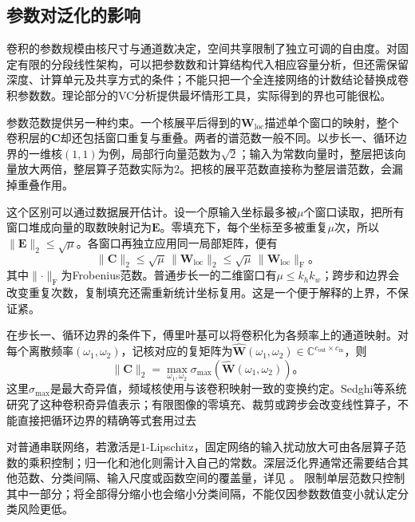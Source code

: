 \subsection{参数对泛化的影响}
\label{sec:cnn-parameter-generalization}

卷积的参数规模由核尺寸与通道数决定，空间共享限制了独立可调的自由度。对固定有限的分段线性架构，可以把参数数和计算结构代入相应容量分析，但还需保留深度、计算单元及共享方式的条件；不能只把一个全连接网络的计数结论替换成卷积参数数。理论部分的VC分析提供最坏情形工具，实际得到的界也可能很松。

参数范数提供另一种约束。一个核展平后得到的$\bm W_{\mathrm{loc}}$描述单个窗口的映射，整个卷积层的$\bm C$却还包括窗口重复与重叠。两者的谱范数一般不同。以步长一、循环边界的一维核$(1,1)$为例，局部行向量范数为$\sqrt2$；输入为常数向量时，整层把该向量放大两倍，整层算子范数实际为$2$。把核的展平范数直接称为整层谱范数，会漏掉重叠作用。

这个区别可以通过数据展开估计。设一个原输入坐标最多被$\mu$个窗口读取，把所有窗口堆成向量的取数映射记为$\bm E$。零填充下，每个坐标至多被重复$\mu$次，所以$\lVert\bm E\rVert_2\leq\sqrt\mu$。各窗口再独立应用同一局部矩阵，便有
\begin{equation}
  \lVert\bm C\rVert_2
    \leq\sqrt\mu\,\lVert\bm W_{\mathrm{loc}}\rVert_2
    \leq\sqrt\mu\,\lVert\bm W_{\mathrm{loc}}\rVert_{\mathrm F}\text{。}
  \label{eq:cnn-operator-bound}
\end{equation}
其中$\lVert\cdot\rVert_{\mathrm F}$为Frobenius范数。普通步长一的二维窗口有$\mu\leq k_hk_w$；跨步和边界会改变重复次数，复制填充还需重新统计坐标复用。这是一个便于解释的上界，不保证紧。

在步长一、循环边界的条件下，傅里叶基可以将卷积化为各频率上的通道映射。对每个离散频率$(\omega_1,\omega_2)$，记核对应的复矩阵为$\widehat{\bm W}(\omega_1,\omega_2)\in\mathbb C^{c_{\mathrm{out}}\times c_{\mathrm{in}}}$，则
\begin{equation}
  \lVert\bm C\rVert_2
    =\max_{\omega_1,\omega_2}
       \sigma_{\max}\!\left(\widehat{\bm W}(\omega_1,\omega_2)\right)\text{。}
  \label{eq:cnn-fourier-norm}
\end{equation}
这里$\sigma_{\max}$是最大奇异值，频域核使用与该卷积映射一致的变换约定。Sedghi等系统研究了这种卷积奇异值表示；有限图像的零填充、裁剪或跨步会改变线性算子，不能直接把循环边界的精确等式套用过去

对普通串联网络，若激活是$1$-Lipschitz，固定网络的输入扰动放大可由各层算子范数的乘积控制；归一化和池化则需计入自己的常数。深层泛化界通常还需要结合其他范数、分类间隔、输入尺度或函数空间的覆盖量，详见
。
限制单层范数只控制其中一部分；将全部得分缩小也会缩小分类间隔，不能仅因参数数值变小就认定分类风险更低。

